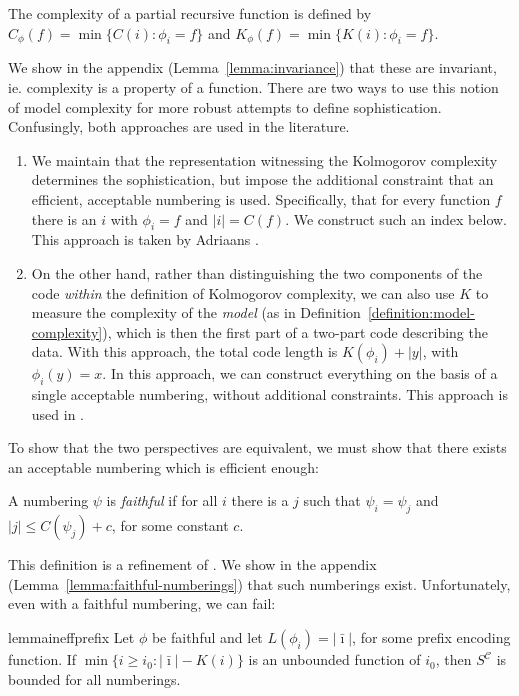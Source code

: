 \documentclass{style/llncs}
\newcommand{\C}{\mathscr C}
\newcommand{\s}{S}
\begin{document}
\begin{definition}
The complexity of a partial recursive function is defined by $C_\phi(f) = \min\{C(i):\phi_i=f\}$ and $K_\phi(f) = \min\{K(i):\phi_i=f\}$.\label{definition:model-complexity}
\end{definition}
We show in the appendix (Lemma~\ref{lemma:invariance}) that these are invariant, ie. complexity is a property of a function. There are two ways to use this notion of model complexity for more robust attempts to define sophistication. Confusingly, both approaches are used in the literature.
\begin{enumerate}
  \item We maintain that the representation witnessing the Kolmogorov complexity determines the sophistication, but impose the additional constraint that an efficient, acceptable numbering is used. Specifically, that for every function $f$ there is an $i$ with $\phi_i=f$ and $|i|=C(f)$. We construct such an index below. This approach is taken by Adriaans \cite{adriaans2012facticity}.
  \item On the other hand, rather than distinguishing the two components of the code \emph{within} the definition of Kolmogorov complexity, we can also use $K$ to measure the complexity of the \emph{model} (as in Definition~\ref{definition:model-complexity}), which is then the first part of a two-part code describing the data. With this approach, the total code length is $K(\phi_i)+|y|$, with $\phi_i(y)=x$. In this approach, we can construct everything on the basis of a single acceptable numbering, without additional constraints. This approach is used in  \cite{cover1985kolmogorov,gacs2001algorithmic,vitanyi2004meaningful,gellmann1996information}.
\end{enumerate}
To show that the two perspectives are equivalent, we must show that there exists an acceptable numbering which is efficient enough:
\begin{definition}\label{def:faithful}
  A numbering $\psi$ is \emph{faithful} if
  for all $i$ there is a $j$ such that $\psi_i=\psi_j$ and
  $|j|\le C(\psi_j)+c$, for some constant $c$.
\end{definition}
This definition is a refinement of \cite[Definition~10]{adriaans2012facticity}. We show in the appendix (Lemma~\ref{lemma:faithful-numberings}) that such numberings exist. Unfortunately, even with a faithful numbering, we can fail:
\begin{restatable}{lemma}{ineffprefix}
Let $\phi$ be faithful and let $L(\phi_i) = |\bar\imath|$, for some prefix encoding function. If $\min\{i\ge i_0:|\bar\imath|-K(i)\}$ is an unbounded function of $i_0$, then $\s^\C$ is bounded for all numberings.\label{lemma:prefix-inefficiency}
\end{restatable}
\end{document}
